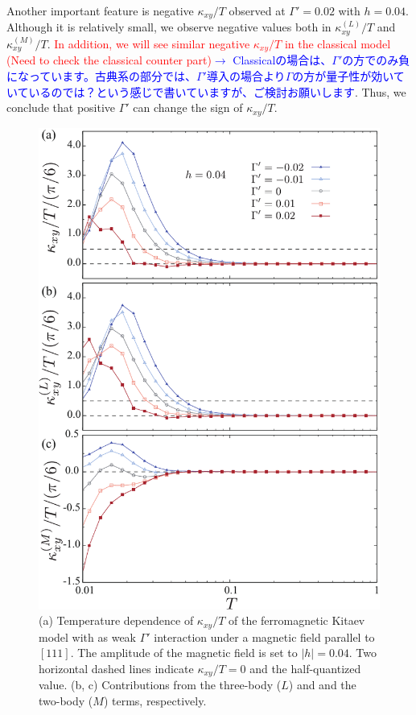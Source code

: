 \documentclass[reprint,amsmath,amssymb,aps,prx]{revtex4-2}
\newcommand{\blue}[1]{\textcolor{blue}{#1}}
\begin{document}
Another important feature is negative $\kappa_{xy}/T$ observed at $\Gamma' = 0.02$ with $h = 0.04$. Although it is relatively small, we observe negative values both in $\kappa_{xy}^{(L)}/T$ and $\kappa_{xy}^{(M)}/T$. \textcolor{red}{In addition, we will see similar negative $\kappa_{xy}/T$ in the classical model (Need to check the classical counter part)}\blue{$\to$ Classicalの場合は、$\Gamma'$の方でのみ負になっています。古典系の部分では、$\Gamma'$導入の場合より$\Gamma$の方が量子性が効いていているのでは？という感じで書いていますが、ご検討お願いします}. Thus, we conclude that positive $\Gamma'$ can change the sign of $\kappa_{xy}/T$. 
\begin{figure}
  \begin{center}
    \includegraphics[width=0.9\linewidth]{Figs/plot_k_all_h0.04_Gp.pdf}
  \end{center}
  \caption{(a) Temperature dependence of $\kappa_{xy}/T$ of the ferromagnetic Kitaev model with as weak $\Gamma'$ interaction under a magnetic field parallel to $[111]$. The amplitude of the magnetic field is set to $|h|=0.04$. Two horizontal dashed lines indicate $\kappa_{xy}/T = 0$ and the half-quantized value. (b, c) Contributions from the three-body ($L$) and and the two-body ($M$) terms, respectively.}
  \label{fig:k_all_h0.04_Gp}
\end{figure}
\end{document}
